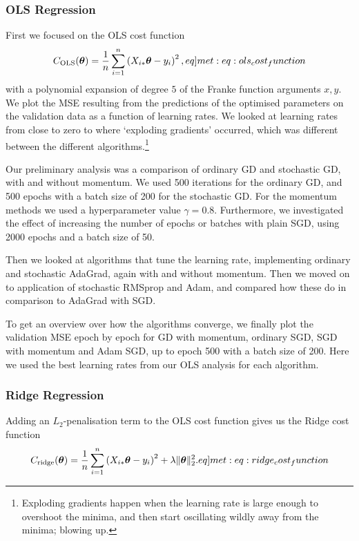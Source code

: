     \subsubsection{OLS Regression}
        First we focused on the OLS cost function
        \begin{align}
            \msub{C}{OLS}(\vec{\theta}) = \frac{1}{n}\sum_{i=1}^n \pclosed{X_{i*}\vec{\theta} - y_i}^2,
            \label[eq]{met:eq:ols_cost_function}
        \end{align}
        with a polynomial expansion of degree $5$ of the Franke function arguments $x,y$. We plot the MSE resulting from the predictions of the optimised parameters on the validation data as a function of learning rates. We looked at learning rates from close to zero to where `exploding gradients' occurred, which was different between the different algorithms.\footnote{Exploding gradients happen when the learning rate is large enough to overshoot the minima, and then start oscillating wildly away from the minima; blowing up.}

        Our preliminary analysis was a comparison of ordinary GD and stochastic GD, with and without momentum. We used 500 iterations for the ordinary GD, and 500 epochs with a batch size of 200 for the stochastic GD. For the momentum methods we used a hyperparameter value $\gamma=0.8$. Furthermore, we investigated the effect of increasing the number of epochs or batches with plain SGD, using 2000 epochs and a batch size of 50.

        Then we looked at algorithms that tune the learning rate, implementing ordinary and stochastic AdaGrad, again with and without momentum. Then we moved on to application of stochastic RMSprop and Adam, and compared how these do in comparison to AdaGrad with SGD.

        To get an overview over how the algorithms converge, we finally plot the validation MSE epoch by epoch for GD with momentum, ordinary SGD, SGD with momentum and Adam SGD, up to epoch 500 with a batch size of 200. Here we used the best learning rates from our OLS analysis for each algorithm.


    \subsubsection{Ridge Regression}
        Adding an $L_2$-penalisation term to the OLS cost function gives us the Ridge cost function
        \begin{align}
            \msub{C}{ridge}(\vec{\theta}) = \frac{1}{n}\sum_{i=1}^n \pclosed{X_{i*}\vec{\theta} - y_i}^2 + \lambda\norm[2]{\vec{\theta}}^2. 
            \label[eq]{met:eq:ridge_cost_function}
        \end{align}

